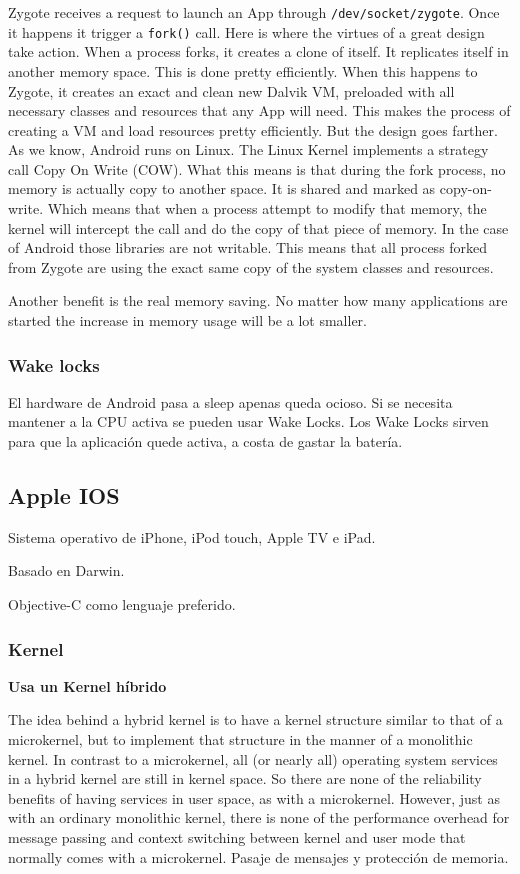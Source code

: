 \documentclass[a4paper, twoside]{article}
\begin{document}
Zygote receives a request to launch an App through \texttt{/dev/socket/zygote}. Once it happens it trigger a \texttt{fork()} call. Here is where the virtues of a great design take action. When a process forks, it creates a clone of itself. It replicates itself in another memory space. This is done pretty efficiently. When this happens to Zygote, it creates an exact and clean new Dalvik VM, preloaded with all necessary classes and resources that any App will need. This makes the process of creating a VM and load resources pretty efficiently. But the design goes farther. As we know, Android runs on Linux. The Linux Kernel implements a strategy call Copy On Write (COW). What this means is that during the fork process, no memory is actually copy to another space. It is shared and marked as copy-on-write. Which means that when a process attempt to modify that memory, the kernel will intercept the call and do the copy of that piece of memory. In the case of Android those libraries are not writable. This means that all process forked from Zygote are using the exact same copy of the system classes and resources. 

Another benefit is the real memory saving. No matter how many applications are started the increase in memory usage will be a lot smaller.

\subsubsection{Wake locks}
El hardware de Android pasa a sleep apenas queda ocioso. Si se necesita mantener a la CPU activa se pueden usar Wake Locks. Los Wake Locks sirven para que la aplicación quede activa, a costa de gastar la batería.

\subsection{Apple IOS}
Sistema operativo de iPhone, iPod touch, Apple TV e iPad.

Basado en Darwin.

Objective-C como lenguaje preferido.

\subsubsection{Kernel}
\textbf{Usa un Kernel híbrido}

The idea behind a hybrid kernel is to have a kernel structure similar to that of a microkernel, but to implement that structure in the manner of a monolithic kernel. In contrast to a microkernel, all (or nearly all) operating system services in a hybrid kernel are still in kernel space. So there are none of the reliability benefits of having services in user space, as with a microkernel. However, just as with an ordinary monolithic kernel, there is none of the performance overhead for message passing and context switching between kernel and user mode that normally comes with a microkernel. Pasaje de mensajes y protección de memoria.
\end{document}
